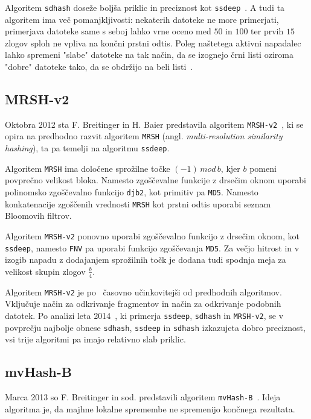 \documentclass{acm_proc_article-sp}
\begin{document}
Algoritem \texttt{sdhash} doseže boljša priklic in preciznost kot \texttt{ssdeep}~\cite{fbhash}. A tudi ta algoritem ima več pomanjkljivosti: nekaterih datoteke ne more primerjati, primerjava datoteke same s seboj lahko vrne oceno med $50$ in $100$ ter prvih $15$ zlogov sploh ne vpliva na končni prstni odtis. Poleg naštetega aktivni napadalec lahko spremeni "slabe" datoteke na tak način, da se izognejo črni listi oziroma "dobre" datoteke tako, da se obdržijo na beli listi~\cite{breitinger2012security}.

\subsection{MRSH-v2}
Oktobra 2012 sta F. Breitinger in H. Baier predstavila algoritem \texttt{MRSH-v2}~\cite{mrsh-v2}, ki se opira na predhodno razvit algoritem \texttt{MRSH} (angl. \emph{multi-resolution similarity hashing}), ta pa temelji na algoritmu \texttt{ssdeep}. 

Algoritem \texttt{MRSH} ima določene sprožilne točke $(-1)\,mod\,b$, kjer $b$ pomeni povprečno velikost bloka. Namesto zgoščevalne funkcije z drsečim oknom uporabi polinomsko zgoščevalno funkcijo \texttt{djb2}, kot primitiv pa \texttt{MD5}. Namesto konkatenacije zgoščenih vrednosti \texttt{MRSH} kot prstni odtis uporabi seznam Bloomovih filtrov. 

Algoritem \texttt{MRSH-v2} ponovno uporabi zgoščevalno funkcijo z drsečim oknom, kot \texttt{ssdeep}, namesto \texttt{FNV} pa uporabi funkcijo zgoščevanja \texttt{MD5}. Za večjo hitrost in v izogib napadu z dodajanjem sprožilnih točk je dodana tudi spodnja meja za velikost skupin zlogov $\frac{b}{4}$. 

Algoritem \texttt{MRSH-v2} je po~\cite{mrsh-v2} časovno učinkovitejši od predhodnih algoritmov. Vključuje način za odkrivanje fragmentov in način za odkrivanje podobnih datotek. Po analizi leta 2014~\cite{breitinger2014}, ki primerja \texttt{ssdeep}, \texttt{sdhash} in \texttt{MRSH-v2}, se v povprečju najbolje obnese \texttt{sdhash}, \texttt{ssdeep} in \texttt{sdhash} izkazujeta dobro preciznost, vsi trije algoritmi pa imajo relativno slab priklic.

\subsection{mvHash-B}
Marca 2013 so F. Breitinger in sod. predstavili algoritem \texttt{mvHash-B}~\cite{mvhash-b}. Ideja algoritma je, da majhne lokalne spremembe ne spremenijo končnega rezultata. 
\end{document}
